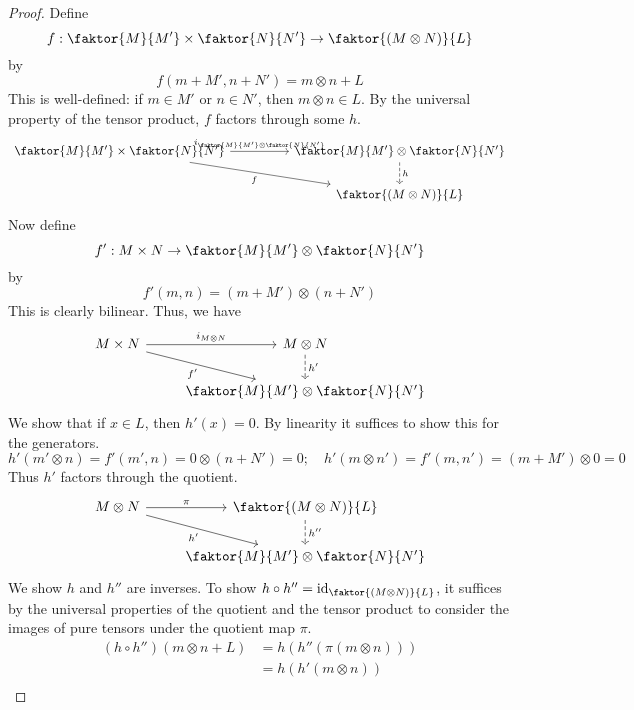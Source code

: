 \begin{proof}
    Define
    \[ f : \faktor{M}{M'} \times \faktor{N}{N'} \to \faktor{(M \otimes N)}{L} \]
    by
    \[ f(m + M', n + N') = m \otimes n + L \]
    This is well-defined: if \( m \in M' \) or \( n \in N' \), then \( m \otimes n \in L \).
    By the universal property of the tensor product, \( f \) factors through some \( h \).
    \[\begin{tikzcd}[column sep=huge]
        {\faktor{M}{M'} \times \faktor{N}{N'}} & {\faktor{M}{M'} \otimes \faktor{N}{N'}} \\
        & {\faktor{(M \otimes N)}{L}}
        \arrow["{i_{\faktor{M}{M'} \otimes \faktor{N}{N'}}}", from=1-1, to=1-2]
        \arrow["h", dashed, from=1-2, to=2-2]
        \arrow["f"', from=1-1, to=2-2]
    \end{tikzcd}\]
    Now define
    \[ f' : M \times N \to \faktor{M}{M'} \otimes \faktor{N}{N'} \]
    by
    \[ f'(m, n) = (m + M') \otimes (n + N') \]
    This is clearly bilinear.
    Thus, we have
    \[\begin{tikzcd}
        {M \times N} & {M \otimes N} \\
        & {\faktor{M}{M'} \otimes \faktor{N}{N'}}
        \arrow["{i_{M \otimes N}}", from=1-1, to=1-2]
        \arrow["{h'}", dashed, from=1-2, to=2-2]
        \arrow["{f'}"', from=1-1, to=2-2]
    \end{tikzcd}\]
    We show that if \( x \in L \), then \( h'(x) = 0 \).
    By linearity it suffices to show this for the generators.
    \[ h'(m' \otimes n) = f'(m', n) = 0 \otimes (n + N') = 0;\quad h'(m \otimes n') = f'(m, n') = (m + M') \otimes 0 = 0 \]
    Thus \( h' \) factors through the quotient.
    \[\begin{tikzcd}
        {M \otimes N} & {\faktor{(M \otimes N)}{L}} \\
        & {\faktor{M}{M'} \otimes \faktor{N}{N'}}
        \arrow["\pi", from=1-1, to=1-2]
        \arrow["{h''}", dashed, from=1-2, to=2-2]
        \arrow["{h'}"', from=1-1, to=2-2]
    \end{tikzcd}\]
    We show \( h \) and \( h'' \) are inverses.
    To show \( h \circ h'' = \id_{\faktor{(M \otimes N)}{L}} \), it suffices by the universal properties of the quotient and the tensor product to consider the images of pure tensors under the quotient map \( \pi \).
    \begin{align*}
        (h \circ h'')(m \otimes n + L) &= h(h''(\pi(m \otimes n))) \\
        &= h(h'(m \otimes n)) \\

\end{align*}
\end{proof}
